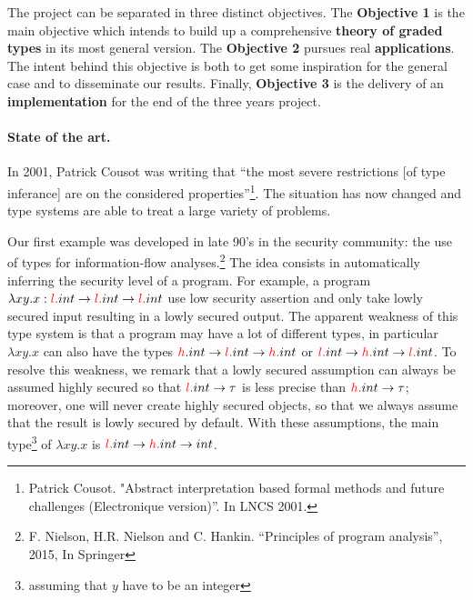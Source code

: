 \documentclass{article}[11pt]
\newcommand\rta{\rightarrow}
\begin{document}
The project can be separated in three distinct objectives. The {\bf Objective 1} is the main objective which intends to build up a comprehensive {\bf theory of graded types} in its most general version. The {\bf Objective 2} pursues real {\bf applications}. %
The intent behind this objective is both to get some inspiration for the general case and to disseminate our results. Finally, {\bf Objective 3} is the delivery of an {\bf implementation} for the end of the three years project.


\paragraph{State of the art.}


In 2001, Patrick Cousot was writing that ``the most severe restrictions [of type inferance] are on the considered properties''\footnote{Patrick Cousot. "Abstract interpretation based formal methods and future challenges (Electronique version)''. In LNCS 2001.}. The situation has now changed and type systems are able to treat a large variety of problems.

Our first example was developed in late 90's in the security community: the use of types for information-flow analyses.\footnote{F. Nielson, H.R. Nielson and C. Hankin. ``Principles of program analysis'', 2015, In Springer} The idea consists in automatically inferring the security level of a program. For example, a program $\lambda xy.x:{\color{red}l.}int\rta {\color{red}l.}int\rta {\color{red}l.}int$ use low security assertion and only take lowly secured input resulting in a lowly secured output. %
The apparent weakness of this type system is that a program may have a lot of different types, in particular $\lambda xy.x$ can also have the types ${\color{red}h}.int\rta {\color{red}l.}int\rta {\color{red}h.}int$ or ${\color{red}l.}int\rta {\color{red}h.}int\rta {\color{red}l.}int$. To resolve this weakness, we remark that a lowly secured assumption can always be assumed highly secured so that ${\color{red}l.}int\rta \tau$ is less precise than ${\color{red}h.}int\rta\tau$; moreover, one will never create highly secured objects, so that we always assume that the result is lowly secured by default. With these assumptions, the main type\footnote{assuming that $y$ have to be an integer} of $\lambda xy.x$ is ${\color{red}l.}int\rta {\color{red}h.}int\rta int$.
\end{document}
